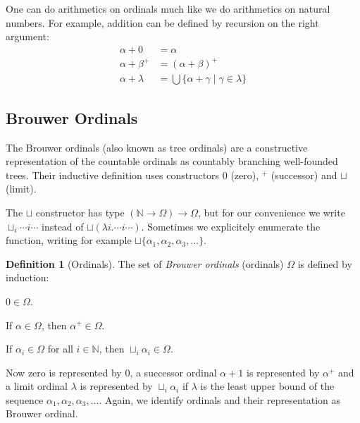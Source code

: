 \documentclass[11pt,oneside,a4paper,final]{report}
\theoremstyle{definition}
\newtheorem{definition}{Definition}
\begin{document}

One can do arithmetics on ordinals much like we do arithmetics on natural
numbers. For example, addition can be defined by recursion on the right
argument:
\begin{align*}
  \alpha + 0       &= \alpha\\
  \alpha + \beta^+ &= (\alpha + \beta)^+\\
  \alpha + \lambda &= \bigcup \{ \alpha + \gamma \; | \; \gamma \in \lambda \}
\end{align*}


\subsection{Brouwer Ordinals}\label{sub:brouwer}

The Brouwer ordinals (also known as tree ordinals) are a constructive
representation of the countable ordinals as countably branching well-founded
trees. Their inductive definition uses constructors $0$ (zero), $^+$
(successor) and $\sqcup$ (limit).

The $\sqcup$ constructor has type $(\mathbb{N} \rightarrow \Omega) \rightarrow
\Omega$, but for our convenience we write $\sqcup_i \cdots i \cdots$ instead
of $\sqcup (\lambda i . \cdots i \cdots)$. Sometimes we explicitely enumerate
the function, writing for example $\sqcup \{ \alpha_1, \alpha_2, \alpha_3,
\ldots \}$.

\begin{definition}[Ordinals]
The set of \emph{Brouwer ordinals} (ordinals) $\Omega$ is defined by
induction:
\begin{compactenum}
  \item
    $0 \in \Omega$.
  \item
    If $\alpha \in \Omega$, then $\alpha^+ \in \Omega$.
  \item
    If $\alpha_i \in \Omega$ for all $i \in \mathbb{N}$, then $\sqcup_i
    \alpha_i \in \Omega$.
\end{compactenum}
\end{definition}

Now zero is represented by $0$, a successor ordinal $\alpha +1$ is represented
by $\alpha^+$ and a limit ordinal $\lambda$ is represented by $\sqcup_i
\alpha_i$ if $\lambda$ is the least upper bound of the sequence $\alpha_1,
\alpha_2, \alpha_3, \ldots$. %
Again, we identify ordinals and their representation as Brouwer ordinal.
\end{document}
